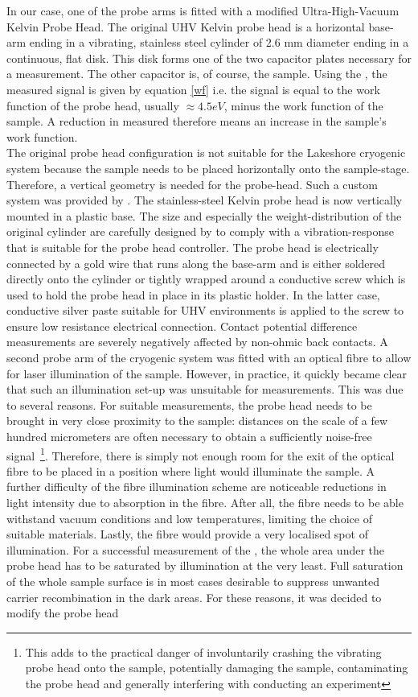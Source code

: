 In our case, one of the probe arms is fitted with a modified \McA{} Ultra-High-Vacuum Kelvin Probe Head. The original \McA{} UHV Kelvin probe head is a horizontal base-arm ending in a vibrating, stainless steel cylinder of 2.6 mm diameter ending in a continuous, flat disk. This disk forms one of the two capacitor plates necessary for a \cpd{} measurement. The other capacitor is, of course, the sample. Using the \McA{}, the measured signal is given by equation \eqref{wf} i.e. the signal is equal to the work function of the probe head, usually $\approx 4.5 eV$, minus the work function of the sample. A reduction in measured \cpd{} therefore means an increase in the sample's work function.\\
The original probe head configuration is not suitable for the Lakeshore cryogenic system because the sample needs to be placed horizontally onto the sample-stage. Therefore, a vertical geometry is needed for the probe-head. Such a custom system was provided by \McA{}. The stainless-steel Kelvin probe head is now vertically mounted in a plastic base. The size and especially the weight-distribution of the original cylinder are carefully designed by \McA{} to comply with a vibration-response that is suitable for the probe head controller. The probe head is electrically connected by a gold wire that runs along the base-arm and is either soldered directly onto the cylinder or tightly wrapped around a conductive screw which is used to hold the probe head in place in its plastic holder. In the latter case, conductive silver paste suitable for UHV environments is applied to the screw to ensure low resistance electrical connection. Contact potential difference measurements are severely negatively affected by non-ohmic back contacts. A second probe arm of the cryogenic system was fitted with an optical fibre to allow for laser illumination of the sample. However, in practice, it quickly became clear that such an illumination set-up was unsuitable for \spv{} measurements. This was due to several reasons. For suitable \cpd{} measurements, the probe head needs to be brought in very close proximity to the sample: distances on the scale of a few hundred micrometers are often necessary to obtain a sufficiently noise-free signal~\footnote{This adds to the practical danger of involuntarily crashing the vibrating probe head onto the sample, potentially damaging the sample, contaminating the probe head and generally interfering with conducting an experiment}. Therefore, there is simply not enough room for the exit of the optical fibre to be placed in a position where light would illuminate the sample. A further difficulty of the fibre illumination scheme are noticeable reductions in light intensity due to absorption in the fibre. After all, the fibre needs to be able withstand vacuum conditions and low temperatures, limiting the choice of suitable materials. Lastly, the fibre would provide a very localised spot of illumination. For a successful measurement of the \spv{}, the whole area under the probe head has to be saturated by illumination at the very least. Full saturation of the whole sample surface is in most cases desirable to suppress unwanted carrier recombination in the dark areas. For these reasons, it was decided to modify the probe head 